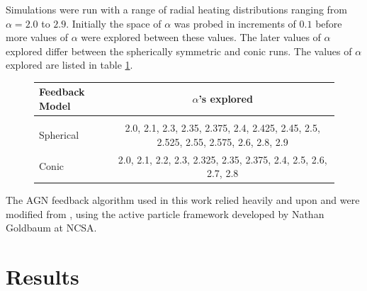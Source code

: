 \documentclass[iop,apjl, twocolappendix]{emulateapj}   %
\begin{document}
Simulations were run with a range of radial heating distributions ranging from
$\alpha = 2.0$ to $2.9$. Initially the space of $\alpha$ was probed in
increments of $0.1$ before more values of $\alpha$ were explored between these
values. The later values of $\alpha$ explored differ between the spherically
symmetric and conic runs. The values of $\alpha$ explored are listed in table
\ref{tab:alphas}.

\begin{figure}
  \begin{center}
  \caption{\label{tab:alphas}
  }
  \begin{tabular}{ l c }
Feedback Model & $\alpha$'s explored \\
\hline\\
    Spherical & 2.0, 2.1, 2.3, 2.35, 2.375, 2.4, 2.425, 2.45, 2.5, 2.525, 2.55, 2.575, 2.6, 2.8, 2.9 \\
    Conic & 2.0, 2.1, 2.2, 2.3, 2.325, 2.35, 2.375, 2.4, 2.5, 2.6, 2.7, 2.8 
  \end{tabular}
  \end{center}
\end{figure}

The AGN feedback algorithm used in this work relied heavily and upon and were
modified from \citep{meece_jr_agn_2016,meece_triggering_2017}, using the active
particle framework developed by Nathan Goldbaum at NCSA.

\section{Results}
\label{sec:results}
\end{document}
